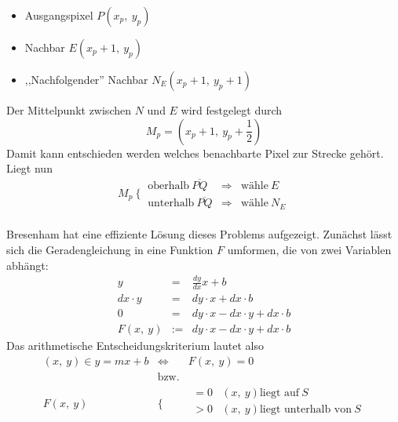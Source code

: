 \begin{Algorithmus}
    \begin{itemize}
        \item Ausgangspixel $P\left( x_p,~ y_p \right)$
        \item Nachbar $E\left( x_p + 1,~ y_p \right)$
        \item ,,Nachfolgender'' Nachbar $N_E\left( x_p + 1,~ y_p + 1 \right)$
    \end{itemize}
    Der Mittelpunkt zwischen $N$ und $E$ wird festgelegt durch
    \begin{equation*}
        M_p = \left( x_p + 1,~ y_p + \frac{1}{2} \right)
    \end{equation*}
    Damit kann entschieden werden welches benachbarte Pixel zur Strecke gehört. 
    Liegt nun
    \begin{equation*}
        M_p ~\Big\{~ \begin{matrix}
            \textrm{oberhalb}~ \overline{PQ} &\Rightarrow& \textrm{wähle}~ E \\ 
            \textrm{unterhalb}~ \overline{PQ} &\Rightarrow& \textrm{wähle}~ N_E 
        \end{matrix}
    \end{equation*}\\
    Bresenham hat eine effiziente Lösung dieses Problems aufgezeigt.
    Zunächst lässt sich die Geradengleichung in eine Funktion $F$ umformen, die von 
    zwei Variablen abhängt: 
    \begin{equation*}\begin{matrix}
        y & = & \frac{dy}{dx} x + b \\
        dx \cdot y & = & dy \cdot x + dx \cdot b \\
        0 & = & dy \cdot x - dx \cdot y + dx \cdot b \\
        F\left(x,~ y\right) & := & dy \cdot x - dx \cdot y + dx \cdot b 
    \end{matrix}\end{equation*}
    Das arithmetische Entscheidungskriterium lautet also 
    \begin{equation*}\begin{matrix}
        (x,~ y) \in y = mx + b & \Leftrightarrow & F\left(x,~ y\right) = 0 \\
        & \textrm{bzw.} & \\
        F\left(x,~ y\right) & \Bigg\{ & \begin{matrix}
            = 0 & \left(x,~ y\right) \textrm{liegt auf}~ S \\
            > 0 & \left(x,~ y\right) \textrm{liegt unterhalb von}~ S \\

\end{matrix}
\end{matrix}
\end{equation*}
\end{Algorithmus}
